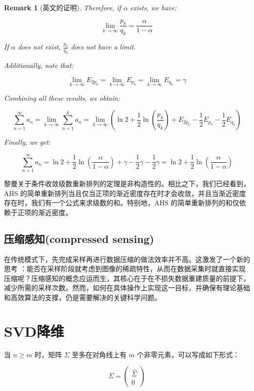 \documentclass{ctexart}
\newtheorem*{remark}{Remark}
\begin{document}
\begin{remark}[英文的证明]
Therefore, if \(\alpha\) exists, we have:

\[
\lim_{k \to \infty} \frac{p_k}{q_k} = \frac{\alpha}{1 - \alpha}
\]

If \(\alpha\) does not exist, \(\frac{p_k}{q_k}\) does not have a limit.

Additionally, note that:

\[
\lim_{k \to \infty} E_{2p_k} = \lim_{k \to \infty} E_{p_k} = \lim_{k \to \infty} E_{q_k} = \gamma
\]

Combining all these results, we obtain:

\[
\sum_{n=1}^{\infty} a_n = \lim_{k \to \infty} \sum_{n=1}^{k} a_n = \lim_{k \to \infty} \left(\ln 2 + \frac{1}{2} \ln \left(\frac{p_k}{q_k}\right) + E_{2p_k} - \frac{1}{2} E_{p_k} - \frac{1}{2} E_{q_k}\right)
\]

Finally, we get:

\[
\sum_{n=1}^{\infty} a_n = \ln 2 + \frac{1}{2} \ln \left(\frac{\alpha}{1 - \alpha}\right) + \gamma - \frac{1}{2}\gamma - \frac{1}{2}\gamma = \ln 2 + \frac{1}{2} \ln \left(\frac{\alpha}{1 - \alpha}\right)
\]



\end{remark}


黎曼关于条件收敛级数重新排列的定理是非构造性的。相比之下，我们已经看到，AHS 的简单重新排列当且仅当正项的渐近密度存在时才会收敛，并且当渐近密度存在时，我们有一个公式来求级数的和。特别地，AHS 的简单重新排列的和仅依赖于正项的渐近密度。

\subsection{压缩感知(compressed sensing)}

在传统模式下，先完成采样再进行数据压缩的做法效率并不高。这激发了一个新的思考 ：能否在采样阶段就考虑到图像的稀疏特性，从而在数据采集时就直接实现压缩呢？压缩感知的概念应运而生，其核心在于在不损失数据重建质量的前提下，减少所需的采样次数。然而，如何在具体操作上实现这一目标，并确保有理论基础和高效算法的支撑，仍是需要解决的关键科学问题。

\section{SVD降维}

当 \( n \ge m \) 时，矩阵 \( \Sigma \) 至多在对角线上有 \( m \) 个非零元素，可以写成如下形式：

\[ \Sigma = \begin{pmatrix}
\hat{\Sigma} \\
0
\end{pmatrix} \]
\end{document}

